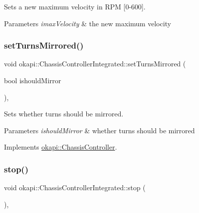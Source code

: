 Sets a new maximum velocity in R\+PM \mbox{[}0-\/600\mbox{]}.


\begin{DoxyParams}{Parameters}
{\em imax\+Velocity} & the new maximum velocity \\
\hline
\end{DoxyParams}
\mbox{\label{classokapi_1_1ChassisControllerIntegrated_a37d538f92439644efa50a226c3cefd6d}} 
\subsubsection{\texorpdfstring{setTurnsMirrored()}{setTurnsMirrored()}}
{\footnotesize\ttfamily void okapi\+::\+Chassis\+Controller\+Integrated\+::set\+Turns\+Mirrored (\begin{DoxyParamCaption}\item[{bool}]{ishould\+Mirror }\end{DoxyParamCaption})\hspace{0.3cm}{\ttfamily [override]}, {\ttfamily [virtual]}}

Sets whether turns should be mirrored.


\begin{DoxyParams}{Parameters}
{\em ishould\+Mirror} & whether turns should be mirrored \\
\hline
\end{DoxyParams}


Implements \mbox{\hyperlink{classokapi_1_1ChassisController_a37ae36ec8936272eb31e3baed7eed417}{okapi\+::\+Chassis\+Controller}}.

\mbox{\label{classokapi_1_1ChassisControllerIntegrated_aab2f5d5cfb8ad96bd32be26a5a4e7113}} 
\subsubsection{\texorpdfstring{stop()}{stop()}}
{\footnotesize\ttfamily void okapi\+::\+Chassis\+Controller\+Integrated\+::stop (\begin{DoxyParamCaption}{ }\end{DoxyParamCaption})\hspace{0.3cm}{\ttfamily [override]}, {\ttfamily [virtual]}}

